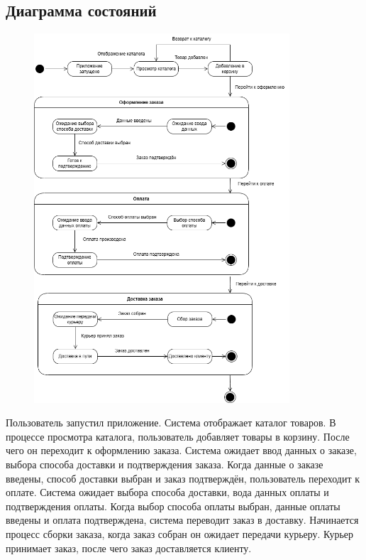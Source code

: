 \documentclass[a4paper]{report}
\begin{document}
\subsection{Диаграмма состояний}
\begin{figure}[H]
    \centering
    \includegraphics[width=0.85\textwidth]{Диаграмма состояний.png}
\end{figure}
Пользователь запустил приложение. Система отображает каталог товаров. В процессе просмотра каталога, пользователь добавляет товары в корзину. После чего он переходит к оформлению заказа. Система ожидает ввод данных о заказе, выбора способа доставки и подтверждения заказа. Когда данные о заказе введены, способ доставки выбран и заказ подтверждён, пользователь переходит к оплате. Система ожидает выбора способа доставки, вода данных оплаты и подтверждения оплаты. Когда выбор способа оплаты выбран, данные оплаты введены и оплата подтверждена, система переводит заказ в доставку. Начинается процесс сборки заказа, когда заказ собран он ожидает передачи курьеру. Курьер принимает заказ, после чего заказ доставляется клиенту.
\end{document}
